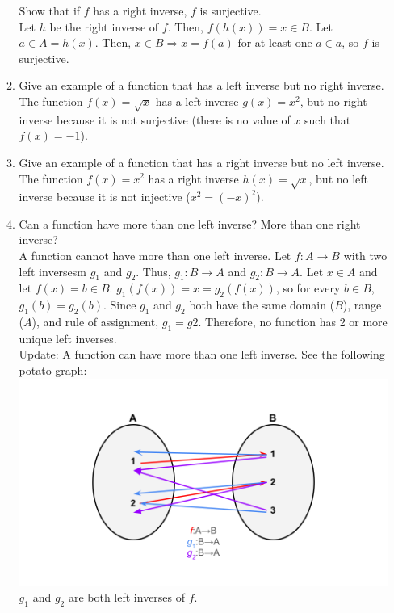 \documentclass{article}
\begin{document}
\begin{enumerate}
\begin{enumerate}
                        Show that if $f$ has a right inverse, $f$ is surjective.\\
                        Let $h$ be the right inverse of $f$. Then, $f(h(x)) = x \in B$. Let $a \in A  = h(x)$. Then, $x \in B \Rightarrow x = f(a)$ for at least one $a \in a$, so $f$ is surjective.
                  \item Give an example of a function that has a left inverse but no right inverse.\\
                        The function $f(x) = \sqrt{x}$ has a left inverse $g(x) = x^{2}$, but no right inverse because it is not surjective (there is no value of $x$ such that $f(x) = -1$).
                  \item Give an example of a function that has a right inverse but no left inverse.\\
                        The function $f(x) = x^{2}$ has a right inverse $h(x) = \sqrt{x}$, but no left inverse because it is not injective ($x^{2} = (-x)^{2}$).
                  \item Can a function have more than one left inverse? More than one right inverse?\\
                        A function cannot have more than one left inverse. Let $f:A \to B$ with two left inversesm $g_{1}$ and $g_{2}$. Thus, $g_{1}:B \to A$ and $g_{2}: B \to A$. Let $x \in A$ and let $f(x) = b \in B$. $g_{1}(f(x)) = x = g_{2}(f(x))$, so for every $b \in B$, $g_{1}(b) = g_{2}(b)$. Since $g_{1}$ and $g_{2}$ both have the same domain ($B$), range ($A$), and rule of assignment, $g_{1} = g{2}$. Therefore, no function has 2 or more unique left inverses.\\
                        Update: A function can have more than one left inverse. See the following potato graph:\\
                        \includegraphics[scale=0.25]{M1.2.5d.png}\\
                        $g_{1}$ and $g_{2}$ are both left inverses of $f$.\\


\end{enumerate}
\end{enumerate}
\end{document}
